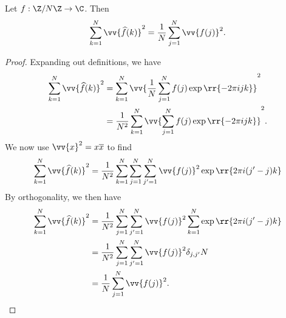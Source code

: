 \documentclass{article}
\begin{document}
\begin{claim*}[6b]
  Let $f:\Z/N\Z\to\C$. Then
  \begin{align*}
    \sum_{k=1}^{N} \vv{\widehat f(k)}^2 = \frac{1}{N}\sum_{j=1}^{N} \vv{f(j)}^2.
  \end{align*}
  \begin{proof}
    Expanding out definitions, we have
    \begin{align*}
      \sum_{k=1}^{N} \vv{\widehat f(k)}^2
      &= \sum_{k=1}^N \vv{\frac{1}{N}\sum_{j=1}^{N} f(j)\exp\rr{-2\pi ijk}}^2\\
      &= \frac{1}{N^2}\sum_{k=1}^N \vv{\sum_{j=1}^{N} f(j)\exp\rr{-2\pi ijk}}^2.
    \end{align*}
    We now use $\vv{x}^2 = x\overline x$ to find
    \begin{align*}
      \sum_{k=1}^{N} \vv{\widehat f(k)}^2
      &= \frac{1}{N^2}\sum_{k=1}^N \sum_{j=1}^{N}\sum_{j'=1}^{N} \vv{f(j)}^2\exp\rr{2\pi i(j'-j)k}\\
    \end{align*}
    By orthogonality, we then have
    \begin{align*}
      \sum_{k=1}^{N} \vv{\widehat f(k)}^2
      &= \frac{1}{N^2}\sum_{j=1}^{N}\sum_{j'=1}^{N} \vv{f(j)}^2\sum_{k=1}^N \exp\rr{2\pi i(j'-j)k}\\
      &= \frac{1}{N^2}\sum_{j=1}^{N}\sum_{j'=1}^{N} \vv{f(j)}^2\delta_{j,j'}N\\
      &= \frac{1}{N}\sum_{j=1}^{N} \vv{f(j)}^2.
    \end{align*}
  \end{proof}
\end{claim*}
\end{document}
